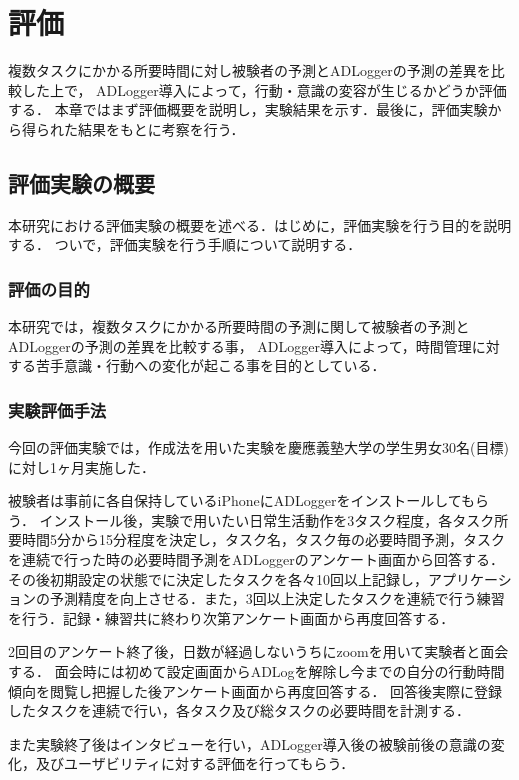\chapter{評価}
複数タスクにかかる所要時間に対し被験者の予測とADLoggerの予測の差異を比較した上で，
ADLogger導入によって，行動・意識の変容が生じるかどうか評価する．
本章ではまず評価概要を説明し，実験結果を示す．最後に，評価実験から得られた結果をもとに考察を行う．

\section{評価実験の概要}
本研究における評価実験の概要を述べる．はじめに，評価実験を行う目的を説明する．
ついで，評価実験を行う手順について説明する．

\subsection{評価の目的}
本研究では，複数タスクにかかる所要時間の予測に関して被験者の予測とADLoggerの予測の差異を比較する事，
ADLogger導入によって，時間管理に対する苦手意識・行動への変化が起こる事を目的としている．

\subsection{実験評価手法}
今回の評価実験では，作成法\cite{Oguro1961}\cite{Tayama2018}を用いた実験を慶應義塾大学の学生男女30名(目標)に対し1ヶ月実施した．

被験者は事前に各自保持しているiPhoneにADLoggerをインストールしてもらう．
インストール後，実験で用いたい日常生活動作を3タスク程度，各タスク所要時間5分から15分程度を決定し，タスク名，タスク毎の必要時間予測，タスクを連続で行った時の必要時間予測をADLoggerのアンケート画面から回答する．その後初期設定の状態でに決定したタスクを各々10回以上記録し，アプリケーションの予測精度を向上させる．また，3回以上決定したタスクを連続で行う練習を行う．記録・練習共に終わり次第アンケート画面から再度回答する．

2回目のアンケート終了後，日数が経過しないうちにzoom\cite{zoom}を用いて実験者と面会する．
面会時には初めて設定画面からADLogを解除し今までの自分の行動時間傾向を閲覧し把握した後アンケート画面から再度回答する．
回答後実際に登録したタスクを連続で行い，各タスク及び総タスクの必要時間を計測する．

また実験終了後はインタビューを行い，ADLogger導入後の被験前後の意識の変化，及びユーザビリティに対する評価を行ってもらう．

